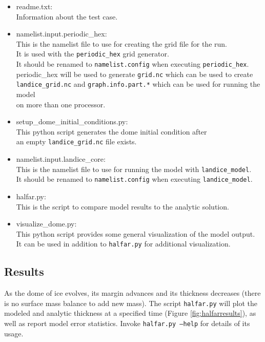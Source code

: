 \begin{itemize}
	\item readme.txt: \\
		Information about the test case.
	\item namelist.input.periodic\_hex: \\
		This is the namelist file to use for creating the grid file for the run. \\
		It is used with the \texttt{periodic\_hex} grid generator.  \\
		It should be renamed to \texttt{namelist.config} when executing \texttt{periodic\_hex}. \\
		periodic\_hex will be used to generate \texttt{grid.nc} which can be used to create \\
		\texttt{landice\_grid.nc} and \texttt{graph.info.part.*} which can be used for running the model \\
		on more than one processor.
	\item setup\_dome\_initial\_conditions.py: \\
		This python script generates the dome initial condition after \\
		an empty \texttt{landice\_grid.nc} file exists.
	\item namelist.input.landice\_core: \\
		This is the namelist file to use for running the model with \texttt{landice\_model}. \\
		It should be renamed to \texttt{namelist.config} when executing \texttt{landice\_model}.
	\item halfar.py: \\
		This is the script to compare model results to the analytic solution.
	\item visualize\_dome.py: \\
		This python script provides some general visualization of the model output.
		It can be used in addition to \texttt{halfar.py} for additional visualization.
\end{itemize}

\subsection{Results}
\label{subsecc:halfar_results}
As the dome of ice evolves, its margin advances and its thickness decreases (there is no surface mass balance to add new mass).  The script \texttt{halfar.py} will plot the modeled and analytic thickness at a specified time (Figure \ref{fig:halfarresults}), as well as report model error statistics.  Invoke \texttt{halfar.py --help} for details of its usage.


